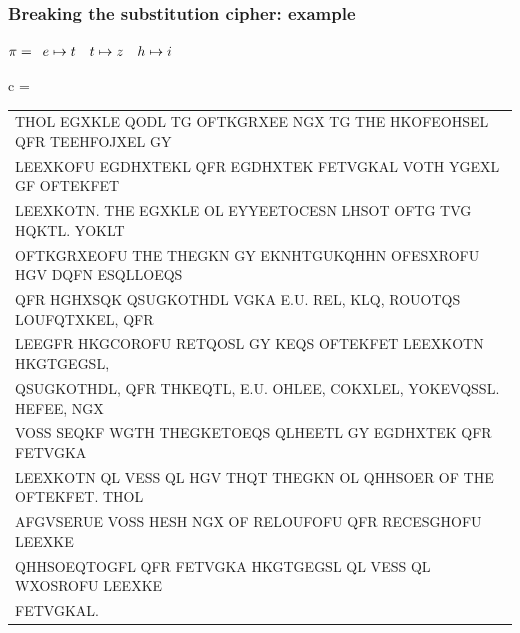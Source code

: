 \documentclass[aspectratio=169, lualatex, 10pt,dvipsnames,svgnames]{beamer} %
\def\enbleu#1{\textcolor{bleu}{#1}}
\def\enrouge#1{\textcolor{rouge}{#1}}
\begin{document}
\begin{frame}
  \frametitle{Breaking the substitution cipher: example}

  
    \enrouge{
    \tiny{$\pi=
      \begin{array}[t]{l}
       e\mapsto t\quad t\mapsto z\quad h\mapsto i\ 
      \end{array}
      $}}
  \vspace{0.25cm}

  \color{vert}
  \tiny{c =
    \begin{tabular}[t]{l}
      \enbleu{T}\enbleu{H}OL EGXKL\enbleu{E} QODL \enbleu{T}G OF\enbleu{T}KGRXE\enbleu{E} NGX \enbleu{T}G \enbleu{T}\enbleu{H}\enbleu{E} HKOFEOHS\enbleu{E}L QFR \enbleu{T}\enbleu{E}E\enbleu{H}FOJX\enbleu{E}L GY \\
      L\enbleu{E}EXKOFU EGDHX\enbleu{T}\enbleu{E}KL QFR EGDHX\enbleu{T}\enbleu{E}K F\enbleu{E}\enbleu{T}VGKAL VO\enbleu{T}\enbleu{H} YGEXL GF OF\enbleu{T}\enbleu{E}KF\enbleu{E}\enbleu{T} \\
      L\enbleu{E}EXKO\enbleu{T}N. \enbleu{T}\enbleu{H}\enbleu{E} EGXKL\enbleu{E} OL \enbleu{E}YY\enbleu{E}E\enbleu{T}OC\enbleu{E}SN LHSO\enbleu{T} OF\enbleu{T}G \enbleu{T}VG HQK\enbleu{T}L. YOKL\enbleu{T} \\
      OF\enbleu{T}KGRXEOFU \enbleu{T}\enbleu{H}\enbleu{E} \enbleu{T}\enbleu{H}\enbleu{E}GKN GY EKNH\enbleu{T}GUKQH\enbleu{H}N OFESXROFU \enbleu{H}GV DQFN ESQLLOEQS \\
      QFR HGHXSQK QSUGKO\enbleu{T}\enbleu{H}DL VGKA \enbleu{E}.U. R\enbleu{E}L, KLQ, ROUO\enbleu{T}QS LOUFQ\enbleu{T}XK\enbleu{E}L, QFR \\
      L\enbleu{E}EGFR HKGCOROFU R\enbleu{E}\enbleu{T}QOSL GY K\enbleu{E}QS OF\enbleu{T}\enbleu{E}KF\enbleu{E}\enbleu{T} L\enbleu{E}EXKO\enbleu{T}N HKG\enbleu{T}GEGSL, \\
      QSUGKO\enbleu{T}\enbleu{H}DL, QFR \enbleu{T}\enbleu{H}K\enbleu{E}Q\enbleu{T}L, \enbleu{E}.U. OHL\enbleu{E}E, COKXL\enbleu{E}L, YOK\enbleu{E}VQSSL. \enbleu{H}\enbleu{E}FE\enbleu{E}, NGX \\
      VOSS S\enbleu{E}QKF WG\enbleu{T}\enbleu{H} \enbleu{T}\enbleu{H}\enbleu{E}GK\enbleu{E}\enbleu{T}OEQS QLH\enbleu{E}E\enbleu{T}L GY EGDHX\enbleu{T}\enbleu{E}K QFR F\enbleu{E}\enbleu{T}VGKA \\
      L\enbleu{E}EXKO\enbleu{T}N QL V\enbleu{E}SS QL \enbleu{H}GV \enbleu{T}\enbleu{H}Q\enbleu{T} \enbleu{T}\enbleu{H}\enbleu{E}GKN OL QHHSO\enbleu{E}R OF \enbleu{T}\enbleu{H}\enbleu{E} OF\enbleu{T}\enbleu{E}KF\enbleu{E}\enbleu{T}. \enbleu{T}\enbleu{H}OL \\
      AFGVS\enbleu{E}RU\enbleu{E} VOSS \enbleu{H}\enbleu{E}SH NGX OF R\enbleu{E}LOUFOFU QFR R\enbleu{E}C\enbleu{E}SGHOFU L\enbleu{E}EXK\enbleu{E} \\
      QHHSOEQ\enbleu{T}OGFL QFR F\enbleu{E}\enbleu{T}VGKA HKG\enbleu{T}GEGSL QL V\enbleu{E}SS QL WXOSROFU L\enbleu{E}EXK\enbleu{E} \\
      F\enbleu{E}\enbleu{T}VGKAL.
    \end{tabular}
  }
  \vspace{0.5cm}


\end{frame}
\end{document}
